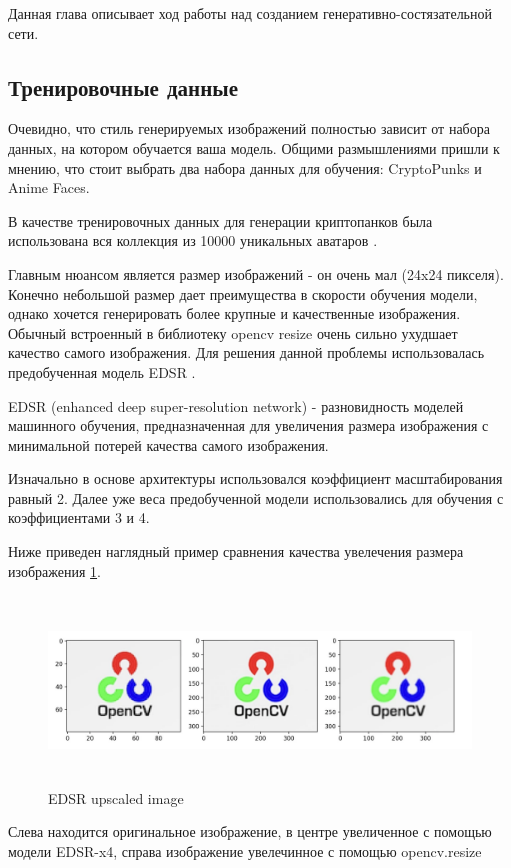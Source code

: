 Данная глава описывает ход работы над созданием генеративно-состязательной сети.

\subsection{Тренировочные данные}

Очевидно, что стиль генерируемых изображений полностью зависит от набора данных, на котором обучается ваша модель. Общими размышлениями пришли к мнению, что стоит выбрать два набора данных для обучения: CryptoPunks и Anime Faces.

В качестве тренировочных данных для генерации криптопанков была использована вся коллекция из 10000 уникальных аватаров \cite{cryptopunks_dataset}.


Главным нюансом является размер изображений - он очень мал (24x24 пикселя). Конечно небольшой размер дает преимущества в скорости обучения модели, однако хочется генерировать более крупные и качественные изображения.
Обычный встроенный в библиотеку opencv resize очень сильно ухудшает качество самого изображения. Для решения данной проблемы использовалась предобученная модель EDSR \cite{EDSR}.

\begin{definition}
    EDSR (enhanced deep super-resolution network) - разновидность моделей машинного обучения, предназначенная для увеличения размера изображения с минимальной потерей качества самого изображения.
\end{definition}

Изначально в основе архитектуры использовался коэффициент масштабирования равный 2. Далее уже веса предобученной модели использовались для обучения с коэффициентами 3 и 4.

Ниже приведен наглядный пример сравнения качества увелечения размера изображения {\color{blue} \ref{fig.EDSR_difference}}.
\begin{figure}
    \centering
    \includegraphics[height=50mm]{fig/EDSR_difference.png}
    \caption{EDSR upscaled image}
    \label{fig.EDSR_difference}
\end{figure}
Слева находится оригинальное изображение, в центре увеличенное с помощью модели EDSR-x4, справа изображение увелечинное с помощью opencv.resize

